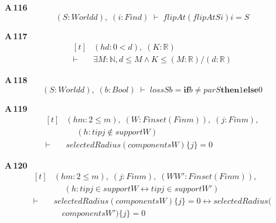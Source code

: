 \noindent\textbf{A\,116}\quad{}
{\footnotesize\[ (\mathit{S} : \mathit{World} \mathit{d}),\; (\mathit{i} : \mathit{Fin} \mathit{d}) \;\vdash\; \mathit{flipAt} (\mathit{flipAt} \mathit{S} \mathit{i}) \mathit{i} = \mathit{S} \]}

\noindent\textbf{A\,117}\quad{}
{\footnotesize\[ \begin{aligned}[t]
&(\mathit{hd} : 0 < \mathit{d}),\; (\mathit{K} : \mathbb{R} )\\
\vdash\;&\exists \mathit{M} : \mathbb{N} , \mathit{d} \leq \mathit{M} \wedge \mathit{K} \leq (\mathit{M} : \mathbb{R} ) / (\mathit{d} : \mathbb{R} )
\end{aligned} \]}

\noindent\textbf{A\,118}\quad{}
{\footnotesize\[ (\mathit{S} : \mathit{World} \mathit{d}),\; (\mathit{b} : \mathit{Bool}) \;\vdash\; \mathit{loss} \mathit{S} \mathit{b} = \mathbf{if} \mathit{b} \neq \mathit{par} \mathit{S} \mathbf{then} 1 \mathbf{else} 0 \]}

\noindent\textbf{A\,119}\quad{}
{\footnotesize\[ \begin{aligned}[t]
&(\mathit{hm} : 2 \leq \mathit{m}),\; (\mathit{W} : \mathit{Finset} (\mathit{Fin} \mathit{m})),\; (\mathit{j} : \mathit{Fin} \mathit{m}),\\
&\quad \; (\mathit{h} : \mathit{tip} \mathit{j} \notin \mathit{support} \mathit{W})\\
\vdash\;&\mathit{selectedRadius} (\mathit{components} \mathit{W}) \{ \mathit{j}\} = 0
\end{aligned} \]}

\noindent\textbf{A\,120}\quad{}
{\footnotesize\[ \begin{aligned}[t]
&(\mathit{hm} : 2 \leq \mathit{m}),\; (\mathit{j} : \mathit{Fin} \mathit{m}),\; (\mathit{W} \mathit{W'} : \mathit{Finset} (\mathit{Fin} \mathit{m})),\\
&\quad \; (\mathit{h} : \mathit{tip} \mathit{j} \in \mathit{support} \mathit{W} \leftrightarrow \mathit{tip} \mathit{j} \in \mathit{support} \mathit{W'})\\
\vdash\;&\mathit{selectedRadius} (\mathit{components} \mathit{W}) \{ \mathit{j}\} = 0 \leftrightarrow \mathit{selectedRadius} (\\
&\quad \mathit{components} \mathit{W'}) \{ \mathit{j}\} = 0
\end{aligned} \]}

